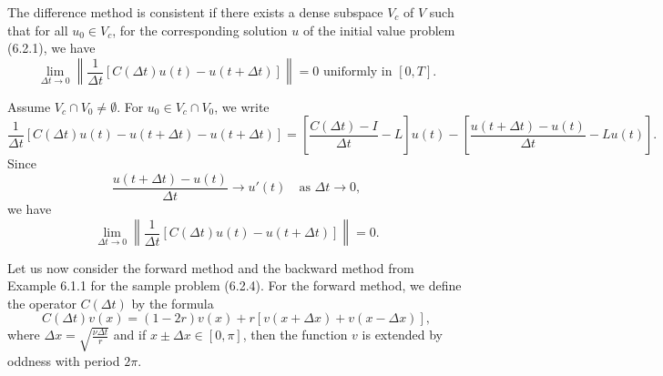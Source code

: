 \begin{frame}
	\begin{definition}
		The difference method is consistent if there exists a dense subspace
		$V_{c}$ of $V$ such that for all $u_{0}\in V_{c}$, for the
		corresponding solution $u$ of the initial value problem (6.2.1), we have
		\begin{equation*}
			\lim_{\Delta t\to0}
			\left\|
			\frac{1}{\Delta t}
			\left[
				C\left(\Delta t\right)
				u\left(t\right)-
				u\left(t+\Delta t\right)
				\right]
			\right\|=0\text{ uniformly in }\left[0,T\right].
		\end{equation*}
	\end{definition}
	Assume $V_{c}\cap V_{0}\neq\emptyset$.
	For $u_{0}\in V_{c}\cap V_{0}$, we write
	\begin{equation*}
		\frac{1}{\Delta t}
		\left[
			C\left(\Delta t\right)u\left(t\right)-
			u\left(t+\Delta t\right)-
			u\left(t+\Delta t\right)
			\right]=
		\left[
			\frac{C\left(\Delta t\right)-I}{\Delta t}-L
			\right]u\left(t\right)-
		\left[
			\frac{u\left(t+\Delta t\right)-u\left(t\right)}{\Delta t}-
			Lu\left(t\right)
			\right].
	\end{equation*}
	Since
	\begin{equation*}
		\frac{u\left(t+\Delta t\right)-u\left(t\right)}{\Delta t}\to u'\left(t\right)\quad\text{as }\Delta t\to0,
	\end{equation*}
	we have
	\begin{equation*}
		\lim_{\Delta t\to0}
		\left\|
		\frac{1}{\Delta t}
		\left[
			C\left(\Delta t\right)
			u\left(t\right)-
			u\left(t+\Delta t\right)
			\right]
		\right\|=0.
	\end{equation*}

	\begin{example}
		Let us now consider the forward method and the backward method from
		Example 6.1.1 for the sample problem (6.2.4).
		For the forward method, we define the operator $C\left(\Delta t\right)$
		by the formula
		\begin{equation*}
			C\left(\Delta t\right)
			v\left(x\right)=
			\left(1-2r\right)v\left(x\right)+
			r
			\left[
				v\left(x+\Delta x\right)+
				v\left(x-\Delta x\right)
				\right],
		\end{equation*}
		where $\Delta x=\sqrt{\frac{\nu\Delta t}{r}}$ and if $x\pm\Delta x\in\left[0,\pi\right]$,
		then the function $v$ is extended by oddness with period $2\pi$.
	\end{example}
\end{frame}


